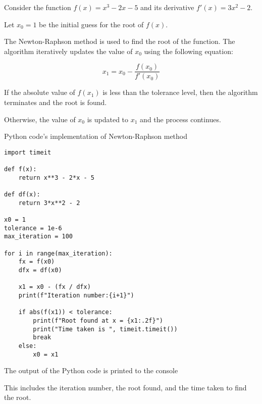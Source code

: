 \documentclass{article}
\begin{document}
Consider the function $f(x) = x^3 - 2x - 5$ and its derivative $f'(x) = 3x^2 - 2$.

Let $x_0 = 1$ be the initial guess for the root of $f(x)$.

The Newton-Raphson method is used to find the root of the function. The algorithm iteratively updates the value of $x_0$ using the following equation:

$$ x_1 = x_0 - \frac{f(x_0)}{f'(x_0)} $$

If the absolute value of $f(x_1)$ is less than the tolerance level, then the algorithm terminates and the root is found.

Otherwise, the value of $x_0$ is updated to $x_1$ and the process continues.

Python code's implementation of Newton-Raphson method 

\begin{verbatim}
import timeit

def f(x):
    return x**3 - 2*x - 5

def df(x):
    return 3*x**2 - 2

x0 = 1
tolerance = 1e-6
max_iteration = 100

for i in range(max_iteration):
    fx = f(x0)
    dfx = df(x0)
    
    x1 = x0 - (fx / dfx)
    print(f"Iteration number:{i+1}")
    
    if abs(f(x1)) < tolerance:
        print(f"Root found at x = {x1:.2f}")
        print("Time taken is ", timeit.timeit())
        break
    else:
        x0 = x1
\end{verbatim}

The output of the Python code is printed to the console

This includes the iteration number, the root found, and the time taken to find the root.
\end{document}
